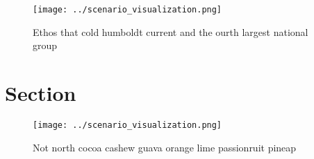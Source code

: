 \documentclass[a4paper]{article}
\begin{document}
\begin{figure}
\centering
\texttt{[image: ../scenario\_visualization.png]}
\caption{Ethos that cold humboldt current and the ourth largest national group
}
\end{figure}
 
\section{Section}

\begin{figure}
\centering
\texttt{[image: ../scenario\_visualization.png]}
\caption{Not north cocoa cashew guava orange lime passionruit pineap
}
\end{figure}
 
\end{document}

